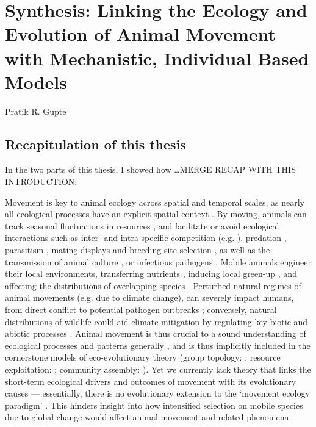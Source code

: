 
{}%
\chapter{Synthesis: Linking the Ecology and Evolution of Animal Movement with Mechanistic, Individual Based Models}\label{ch:discussion}

{{Pratik R. Gupte}}

\section*{Recapitulation of this thesis}

In the two parts of this thesis, I showed how \ldots MERGE RECAP WITH THIS INTRODUCTION.

Movement is key to animal ecology across spatial and temporal scales, as nearly all ecological processes have an explicit spatial context \citep{nathan2008a}.
By moving, animals can track seasonal fluctuations in resources \citep{geremia2019,abrahms2021a}, and facilitate or avoid ecological interactions such as inter- and intra-specific competition (e.g. \cite{duckworth2007}), predation \citep[e.g.][]{kohl2018}, parasitism \citep{weinstein2018}, mating displays and breeding site selection \citep{kempenaers2017}, as well as the transmission of animal culture \citep{jesmer2018,klump2021}, or infectious pathogens \citep{weinstein2018,monk2022,stroeymeyt2018}.
Mobile animals engineer their local environments, transferring nutrients \citep{leroux2018}, inducing local green-up \citep{geremia2019}, and affecting the distributions of overlapping species \citep[see e.g.][]{kohl2018,leroux2018,duckworth2007,monk2022}.
Perturbed natural regimes of animal movements (e.g. due to climate change), can severely impact humans, from direct conflict \citep{abrahms2021} to potential pathogen outbreaks \citep{carlson2022a,wille2022}; conversely, natural distributions of wildlife could aid climate mitigation by regulating key biotic and abiotic processes \citep{schmitz2018,malhi2022}.
Animal movement is thus crucial to a sound understanding of ecological processes and patterns generally \citep{jeltsch2013,schlagel2020}, and is thus implicitly included in the cornerstone models of eco-evolutionary theory (group topology: \cite{hamilton1971}; resource exploitation: \cite{fretwell1970, charnov1976}; community assembly: \cite{macarthur1967}).
Yet we currently lack theory that links the short-term ecological drivers and outcomes of movement with its evolutionary causes --- essentially, there is no evolutionary extension to the `movement ecology paradigm' \citep{holyoak2008}.
This hinders insight into how intensified selection on mobile species due to global change \citep[e.g.][]{vangils2016} would affect animal movement and related phenomena.

